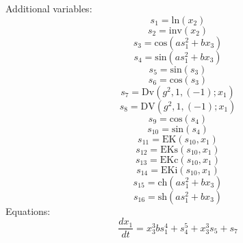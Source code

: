 \documentclass[10pt,a4paper]{article}
\begin{document}
Additional variables:
\begin{dmath*}s_{1} = \text{ln}\left(x_{2}\right)\end{dmath*}
\begin{dmath*}s_{2} = \text{inv}\left(x_{2}\right)\end{dmath*}
\begin{dmath*}s_{3} = \text{cos}\left(a  s_{1} ^ {2} + b  x_{3}\right)\end{dmath*}
\begin{dmath*}s_{4} = \text{sin}\left(a  s_{1} ^ {2} + b  x_{3}\right)\end{dmath*}
\begin{dmath*}s_{5} = \text{sin}\left(s_{3}\right)\end{dmath*}
\begin{dmath*}s_{6} = \text{cos}\left(s_{3}\right)\end{dmath*}
\begin{dmath*}s_{7} = \text{Dv}\left(g ^ {2}, 1, \left(-1\right); x_{1}\right)\end{dmath*}
\begin{dmath*}s_{8} = \text{DV}\left(g ^ {2}, 1, \left(-1\right); x_{1}\right)\end{dmath*}
\begin{dmath*}s_{9} = \text{cos}\left(s_{4}\right)\end{dmath*}
\begin{dmath*}s_{10} = \text{sin}\left(s_{4}\right)\end{dmath*}
\begin{dmath*}s_{11} = \text{EK}\left(s_{10}, x_{1}\right)\end{dmath*}
\begin{dmath*}s_{12} = \text{EKs}\left(s_{10}, x_{1}\right)\end{dmath*}
\begin{dmath*}s_{13} = \text{EKc}\left(s_{10}, x_{1}\right)\end{dmath*}
\begin{dmath*}s_{14} = \text{EKi}\left(s_{10}, x_{1}\right)\end{dmath*}
\begin{dmath*}s_{15} = \text{ch}\left(a  s_{1} ^ {2} + b  x_{3}\right)\end{dmath*}
\begin{dmath*}s_{16} = \text{sh}\left(a  s_{1} ^ {2} + b  x_{3}\right)\end{dmath*}
Equations:
\begin{dmath*}\frac{dx_{1}}{dt} = x_{3} ^ {3}  b  s_{1} ^ {4} + s_{4} ^ {5} + x_{3} ^ {3}  s_{5} + s_{7}\end{dmath*}
\end{document}
